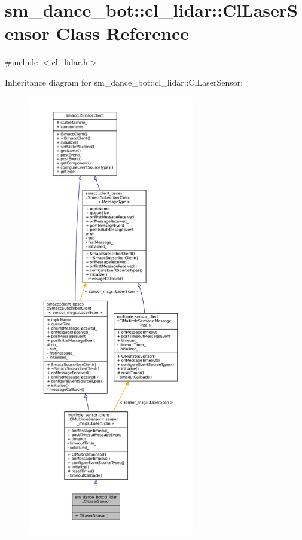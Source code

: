 \hypertarget{classsm__dance__bot_1_1cl__lidar_1_1ClLaserSensor}{}\section{sm\+\_\+dance\+\_\+bot\+:\+:cl\+\_\+lidar\+:\+:Cl\+Laser\+Sensor Class Reference}
\label{classsm__dance__bot_1_1cl__lidar_1_1ClLaserSensor}


{\ttfamily \#include $<$cl\+\_\+lidar.\+h$>$}



Inheritance diagram for sm\+\_\+dance\+\_\+bot\+:\+:cl\+\_\+lidar\+:\+:Cl\+Laser\+Sensor\+:
\nopagebreak
\begin{figure}[H]
\begin{center}
\leavevmode
\includegraphics[height=550pt]{classsm__dance__bot_1_1cl__lidar_1_1ClLaserSensor__inherit__graph}
\end{center}
\end{figure}


